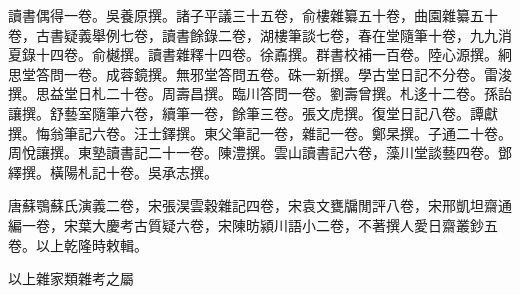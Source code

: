 \begin{pinyinscope}
讀書偶得一卷。吳養原撰。諸子平議三十五卷，俞樓雜纂五十卷，曲園雜纂五十卷，古書疑義舉例七卷，讀書餘錄二卷，湖樓筆談七卷，春在堂隨筆十卷，九九消夏錄十四卷。俞樾撰。讀書雜釋十四卷。徐鼒撰。群書校補一百卷。陸心源撰。絅思堂答問一卷。成蓉鏡撰。無邪堂答問五卷。硃一新撰。學古堂日記不分卷。雷浚撰。思益堂日札二十卷。周壽昌撰。臨川答問一卷。劉壽曾撰。札迻十二卷。孫詒讓撰。舒藝室隨筆六卷，續筆一卷，餘筆三卷。張文虎撰。復堂日記八卷。譚獻撰。悔翁筆記六卷。汪士鐸撰。東父筆記一卷，雜記一卷。鄭杲撰。子通二十卷。周悅讓撰。東塾讀書記二十一卷。陳澧撰。雲山讀書記六卷，藻川堂談藝四卷。鄧繹撰。橫陽札記十卷。吳承志撰。

唐蘇鶚蘇氏演義二卷，宋張淏雲穀雜記四卷，宋袁文甕牖閒評八卷，宋邢凱坦齋通編一卷，宋葉大慶考古質疑六卷，宋陳昉潁川語小二卷，不著撰人愛日齋叢鈔五卷。以上乾隆時敕輯。

以上雜家類雜考之屬


\end{pinyinscope}
